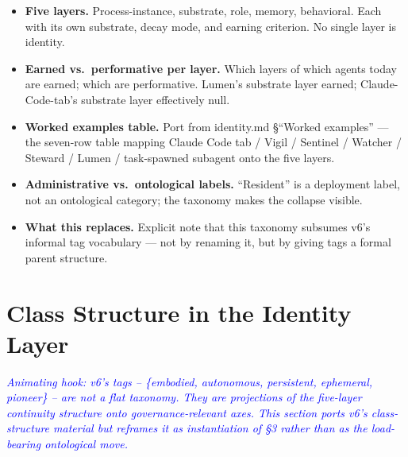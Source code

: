 \documentclass[11pt,twocolumn]{article}
\newcommand{\outlinenote}[1]{\textcolor{blue}{\textit{#1}}}
\begin{document}
\begin{itemize}
  \item \textbf{Five layers.} Process-instance, substrate, role,
        memory, behavioral. Each with its own substrate, decay
        mode, and earning criterion. No single layer is identity.
  \item \textbf{Earned vs.\ performative per layer.} Which layers
        of which agents today are earned; which are performative.
        Lumen's substrate layer earned; Claude-Code-tab's
        substrate layer effectively null.
  \item \textbf{Worked examples table.} Port from
        identity.md §``Worked examples'' — the seven-row table
        mapping Claude Code tab / Vigil / Sentinel / Watcher /
        Steward / Lumen / task-spawned subagent onto the five
        layers.
  \item \textbf{Administrative vs.\ ontological labels.}
        ``Resident'' is a deployment label, not an ontological
        category; the taxonomy makes the collapse visible.
  \item \textbf{What this replaces.} Explicit note that this
        taxonomy subsumes v6's informal tag vocabulary — not by
        renaming it, but by giving tags a formal parent structure.
\end{itemize}

\section{Class Structure in the Identity Layer}
\outlinenote{Animating hook: v6's tags -- \{embodied, autonomous,
persistent, ephemeral, pioneer\} -- are not a flat taxonomy. They
are projections of the five-layer continuity structure onto
governance-relevant axes. This section ports v6's class-structure
material but reframes it as instantiation of §3 rather than as the
load-bearing ontological move.}
\end{document}
